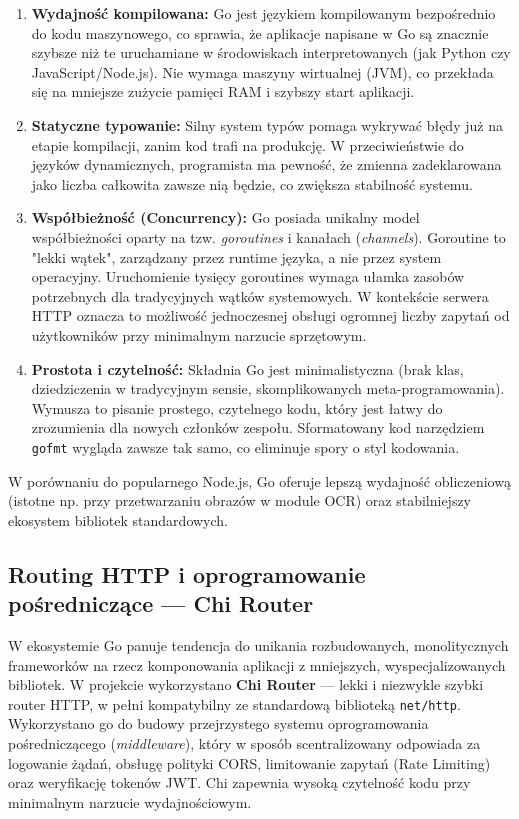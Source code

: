 \begin{enumerate}
    \item \textbf{Wydajność kompilowana:} Go jest językiem kompilowanym bezpośrednio do kodu maszynowego, co sprawia, że aplikacje napisane w Go są znacznie szybsze niż te uruchamiane w środowiskach interpretowanych (jak Python czy JavaScript/Node.js). Nie wymaga maszyny wirtualnej (JVM), co przekłada się na mniejsze zużycie pamięci RAM i szybszy start aplikacji.
    
    \item \textbf{Statyczne typowanie:} Silny system typów pomaga wykrywać błędy już na etapie kompilacji, zanim kod trafi na produkcję. W przeciwieństwie do języków dynamicznych, programista ma pewność, że zmienna zadeklarowana jako liczba całkowita zawsze nią będzie, co zwiększa stabilność systemu.
    
    \item \textbf{Współbieżność (Concurrency):} Go posiada unikalny model współbieżności oparty na tzw. \textit{goroutines} i kanałach (\textit{channels}). Goroutine to "lekki wątek", zarządzany przez runtime języka, a nie przez system operacyjny. Uruchomienie tysięcy goroutines wymaga ułamka zasobów potrzebnych dla tradycyjnych wątków systemowych. W kontekście serwera HTTP oznacza to możliwość jednoczesnej obsługi ogromnej liczby zapytań od użytkowników przy minimalnym narzucie sprzętowym.
    
    \item \textbf{Prostota i czytelność:} Składnia Go jest minimalistyczna (brak klas, dziedziczenia w tradycyjnym sensie, skomplikowanych meta-programowania). Wymusza to pisanie prostego, czytelnego kodu, który jest łatwy do zrozumienia dla nowych członków zespołu. Sformatowany kod narzędziem \texttt{gofmt} wygląda zawsze tak samo, co eliminuje spory o styl kodowania.
\end{enumerate}

W porównaniu do popularnego Node.js, Go oferuje lepszą wydajność obliczeniową (istotne np. przy przetwarzaniu obrazów w module OCR) oraz stabilniejszy ekosystem bibliotek standardowych.

\subsection{Routing HTTP i oprogramowanie pośredniczące --- Chi Router}

W ekosystemie Go panuje tendencja do unikania rozbudowanych, monolitycznych frameworków na rzecz komponowania aplikacji z mniejszych, wyspecjalizowanych bibliotek. W projekcie wykorzystano \textbf{Chi Router} --- lekki i niezwykle szybki router HTTP, w pełni kompatybilny ze standardową biblioteką \texttt{net/http}. Wykorzystano go do budowy przejrzystego systemu oprogramowania pośredniczącego (\textit{middleware}), który w sposób scentralizowany odpowiada za logowanie żądań, obsługę polityki CORS, limitowanie zapytań (Rate Limiting) oraz weryfikację tokenów JWT. Chi zapewnia wysoką czytelność kodu przy minimalnym narzucie wydajnościowym.

